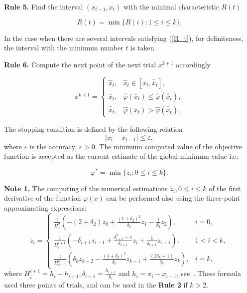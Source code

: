 \documentclass[runningheads]{llncs}
\begin{document}
\textbf{Rule 5.} Find the interval $(x_{t-1}, x_t)$ with the minimal characteristic $R(t)$

\begin{equation}\label{R_t}
R(t) = \min \{R(i) : 1 \le i \le k\}.
\end{equation}

In the case when there are several intervals satisfying (\ref{R_t}), for definiteness, the interval with the minimum number $t$ is taken.

\textbf{Rule 6.} Compute the next point of the next trial $x^{k+1}$ accordingly

\begin{equation}\label{key}
x^{k+1} = \left\{
\begin{array}{ll}
\widehat{x}_t, & \widehat{x}_t \in [\bar{x_t},\bar{\bar{x}}_t], \\
\bar{x}_t, & \widehat{\varphi}(\bar{x}_t) \le \widehat{\varphi}(\bar{\bar{x}}_t), \\
\bar{\bar{x}}_t, & \widehat{\varphi}(\bar{x}_t) > \widehat{\varphi}(\bar{\bar{x}}_t).
\end{array}
\right.
\end{equation}

The stopping condition is defined by the following relation
\begin{equation}
|x_t-x_{t-1}| \le \varepsilon,
\end{equation}
where $\varepsilon$ is the accuracy, $\varepsilon > 0$.
The minimum computed value of the objective function is accepted as the current estimate of the global minimum value i.e:

\begin{equation}
\varphi^* = \min \{z_i : 0 \le i \le k\}.
\end{equation}

\textbf{Note 1.} The computing of the numerical estimations $\dot{z}_i, 0 \le i \le k$ of the first derivative of the function $\varphi(x)$ can be performed also using the three-point approximating expressions:
\begin{equation}
\dot{z}_i = \left\{
\begin{array}{ll}
\frac{1}{H_1^2}
\left( -(2+\delta_2)z_0+\frac{(1+\delta_2)^2}{\delta_2}z_1-\frac{1}{\delta_2}z_2 \right), & i = 0, \\
\frac{1}{H_i^{i+1}}
\left( -\delta_{i+1}z_{i-1}+\frac{\delta_{i+1}^2-1}{\delta_{i+1}}z_i+\frac{1}{\delta_{i+1}}z_{i+1}
\right), & 1 < i < k, \\
\frac{1}{H_{k-1}^k}
\left(
\delta_k z_{k-2}-\frac{(1+\delta_k)^2}{\delta_k}z_{k-1}+\frac{(2\delta_k+1)}{\delta_k}z_k
\right), & i = k,
\end{array}
\right.
\end{equation}
where $H_i^{i+1} = h_i+h_{i+1}, \delta_{i+1} =\frac{h_{i+1}}{h_i}$ and $h_i=x_i-x_{i-1}$, see~\cite{Griewank2008}.
These formula used three points of trials, and can be used in the \textbf{Rule 2} if $k > 2$.
\end{document}
